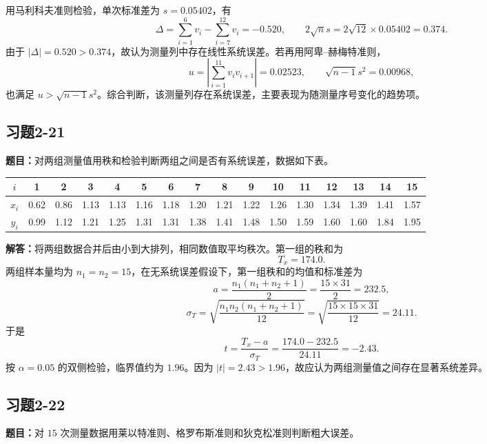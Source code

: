 \documentclass[UTF8,zihao=-4]{ctexart}
\newcommand{\problem}[1]{\subsection*{#1}}
\newcommand{\timu}{\noindent\textbf{题目：}}
\newcommand{\jieda}{\noindent\textbf{解答：}}
\begin{document}
{用马利科夫准则检验，单次标准差为 $s=0.05402$，有
\begin{equation*}
    \Delta=\sum_{i=1}^{6}v_i-\sum_{i=7}^{12}v_i=-0.520,
    \qquad 2\sqrt{n}s=2\sqrt{12}\times0.05402=0.374.
\end{equation*}
由于 $|\Delta|=0.520>0.374$，故认为测量列中存在线性系统误差。若再用阿卑--赫梅特准则，
\begin{equation*}
    u=\left|\sum_{i=1}^{11}v_iv_{i+1}\right|=0.02523,
    \qquad \sqrt{n-1}s^2=0.00968,
\end{equation*}
也满足 $u>\sqrt{n-1}s^2$。综合判断，该测量列存在系统误差，主要表现为随测量序号变化的趋势项。

\problem{习题2-21}
\timu 对两组测量值用秩和检验判断两组之间是否有系统误差，数据如下表。

\begin{center}
\scriptsize
\setlength{\tabcolsep}{3pt}
\begin{tabular}{c|ccccccccccccccc}
\toprule
$i$ & 1 & 2 & 3 & 4 & 5 & 6 & 7 & 8 & 9 & 10 & 11 & 12 & 13 & 14 & 15\\
\midrule
$x_i$ & 0.62 & 0.86 & 1.13 & 1.13 & 1.16 & 1.18 & 1.20 & 1.21 & 1.22 & 1.26 & 1.30 & 1.34 & 1.39 & 1.41 & 1.57\\
$y_i$ & 0.99 & 1.12 & 1.21 & 1.25 & 1.31 & 1.31 & 1.38 & 1.41 & 1.48 & 1.50 & 1.59 & 1.60 & 1.60 & 1.84 & 1.95\\
\bottomrule
\end{tabular}
\end{center}

\jieda 将两组数据合并后由小到大排列，相同数值取平均秩次。第一组的秩和为
\begin{equation*}
    T_x=174.0.
\end{equation*}
两组样本量均为 $n_1=n_2=15$，在无系统误差假设下，第一组秩和的均值和标准差为
\begin{equation*}
    a=\frac{n_1(n_1+n_2+1)}{2}=\frac{15\times31}{2}=232.5,
\end{equation*}
\begin{equation*}
    \sigma_T=\sqrt{\frac{n_1n_2(n_1+n_2+1)}{12}}
    =\sqrt{\frac{15\times15\times31}{12}}=24.11.
\end{equation*}
于是
\begin{equation*}
    t=\frac{T_x-a}{\sigma_T}=\frac{174.0-232.5}{24.11}=-2.43.
\end{equation*}
按 $\alpha=0.05$ 的双侧检验，临界值约为 $1.96$。因为 $|t|=2.43>1.96$，故应认为两组测量值之间存在显著系统差异。

\problem{习题2-22}
\timu 对 $15$ 次测量数据用莱以特准则、格罗布斯准则和狄克松准则判断粗大误差。

}
\end{document}
